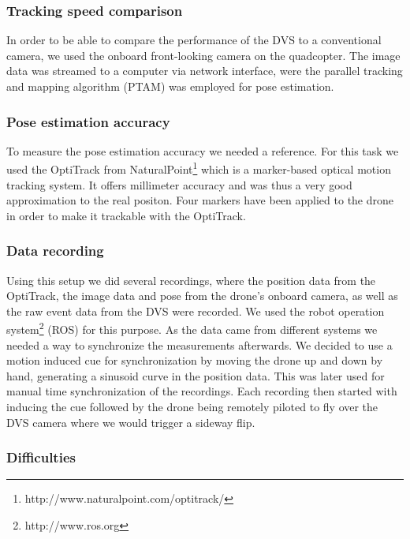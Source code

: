 \subsubsection{Tracking speed comparison}\label{sec:trackingspeedcomparison}

In order to be able to compare the performance of the DVS to a conventional camera, we used the onboard front-looking camera on the quadcopter. The image data was streamed to a computer via network interface, were the parallel tracking and mapping algorithm (PTAM)\cite{PTAM} was employed for pose estimation.


\subsubsection{Pose estimation accuracy}\label{sec:poseaccuracy}

To measure the pose estimation accuracy we needed a reference. For this task we used the OptiTrack from NaturalPoint\footnote{http://www.naturalpoint.com/optitrack/} which is a marker-based optical motion tracking system. It offers millimeter accuracy and was thus a very good approximation to the real positon. Four markers have been applied to the drone in order to make it trackable with the OptiTrack.

\subsubsection{Data recording}\label{sec:datarecording}

Using this setup we did several recordings, where the position data from the OptiTrack, the image data and pose from the drone's onboard camera, as well as the raw event data from the DVS were recorded. We used the robot operation system\footnote{http://www.ros.org} (ROS) for this purpose.
As the data came from different systems we needed a way to synchronize the measurements afterwards. We decided to use a motion induced cue for synchronization by moving the drone up and down by hand, generating a sinusoid curve in the position data. This was later used for manual time synchronization of the recordings. 
Each recording then started with inducing the cue followed by the drone being remotely piloted to fly over the DVS camera where we would trigger a sideway flip. 


\subsubsection{Difficulties}\label{sec:difficulties}

